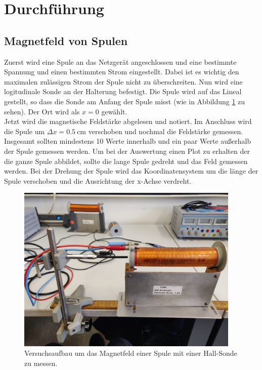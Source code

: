 \section{Durchführung}
\label{sec:Durchführung}
\subsection{Magnetfeld von Spulen}
Zuerst wird eine Spule an das Netzgerät angeschlossen und eine bestimmte
Spannung und einen bestimmten Strom eingestellt. Dabei ist es wichtig den maximalen
zulässigen Strom der Spule nicht zu überschreiten.
Nun wird eine logitudinale Sonde an der Halterung befestigt. Die Spule wird auf das Lineal gestellt, so dass
die Sonde am Anfang der Spule misst (wie in Abbildung \ref{fig:spule_lang} zu sehen). Der Ort wird als $x=0$ gewählt.\\
Jetzt wird die magnetische Feldstärke abgelesen und notiert. Im Anschluss wird die Spule um $\Delta x = \SI{0.5}{\cm}$ verschoben und
nochmal die Feldstärke gemessen. Insgesamt sollten mindestens 10 Werte innerhalb und ein paar Werte außerhalb der Spule gemessen werden.
Um bei der Auswertung einen Plot zu erhalten der die ganze Spule abbildet, sollte die lange Spule gedreht und das Feld gemessen werden.
Bei der Drehung der Spule wird das Koordinatensystem um die länge der Spule verschoben und die Ausrichtung der x-Achse verdreht.
\begin{figure}
    \centering
    \includegraphics[height=8cm]{content/spule_lang.jpg}
    \caption{Versuchsaufbau um das Magnetfeld einer Spule mit einer Hall-Sonde zu messen.}
    \label{fig:spule_lang}
\end{figure}

